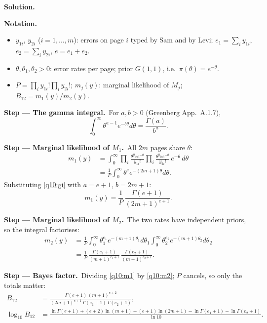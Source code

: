 \documentclass[11pt,a4paper]{article}
\numberwithin{equation}{questao}   %
\newenvironment{notacao}{\par\smallskip\noindent\textbf{Notation.}\begin{itemize}[leftmargin=1.4em,topsep=1pt,itemsep=0pt]\small}{\end{itemize}}
\newcommand{\passo}[2]{\par\smallskip\noindent\textbf{Step --- #1.}~#2}
\newcommand{\solhead}{\par\medskip\noindent{\color{blue!55!black}\rule{\linewidth}{0.3pt}}\par\noindent\textbf{Solution.}}
\newcommand{\1}{\mathbf{1}}
\begin{document}
\begin{sol}
\solhead
\begin{notacao}
\item $y_{1i}$, $y_{2i}$ ($i=1,\ldots,m$): errors on page $i$ typed by Sam and by Levi; $e_1=\sum_iy_{1i}$, $e_2=\sum_iy_{2i}$, $e=e_1+e_2$.
\item $\theta,\theta_1,\theta_2>0$: error rates per page; prior $G(1,1)$, i.e.\ $\pi(\theta)=e^{-\theta}$.
\item $P=\prod_iy_{1i}!\prod_iy_{2i}!$; $m_j(y)$: marginal likelihood of $M_j$; $B_{12}=m_1(y)/m_2(y)$.
\end{notacao}

\passo{The gamma integral}{For $a,b>0$ (Greenberg App.~A.1.7),}
\begin{equation}\label{q10:gi}
\int_0^\infty\theta^{a-1}e^{-b\theta}d\theta=\frac{\Gamma(a)}{b^{a}}.
\end{equation}

\passo{Marginal likelihood of $M_1$}{All $2m$ pages share $\theta$:}
\begin{align}
m_1(y)&=\int_0^\infty\prod_{i}\frac{\theta^{y_{1i}}e^{-\theta}}{y_{1i}!}\prod_{i}\frac{\theta^{y_{2i}}e^{-\theta}}{y_{2i}!}\,e^{-\theta}\,d\theta\label{q10:m1a}\\
&=\frac1P\int_0^\infty\theta^{e}e^{-(2m+1)\theta}d\theta.\label{q10:m1b}
\end{align}
Substituting \eqref{q10:gi} with $a=e+1$, $b=2m+1$:
\begin{equation}\label{q10:m1}
m_1(y)=\frac1P\,\frac{\Gamma(e+1)}{(2m+1)^{e+1}}.
\end{equation}

\passo{Marginal likelihood of $M_2$}{The two rates have independent priors, so the integral factorises:}
\begin{align}
m_2(y)&=\frac1P\int_0^\infty\theta_1^{e_1}e^{-(m+1)\theta_1}d\theta_1\int_0^\infty\theta_2^{e_2}e^{-(m+1)\theta_2}d\theta_2\label{q10:m2a}\\
&=\frac1P\,\frac{\Gamma(e_1+1)}{(m+1)^{e_1+1}}\,\frac{\Gamma(e_2+1)}{(m+1)^{e_2+1}}.\label{q10:m2}
\end{align}

\passo{Bayes factor}{Dividing \eqref{q10:m1} by \eqref{q10:m2}; $P$ cancels, so only the totals matter:}
\begin{align}
B_{12}&=\frac{\Gamma(e+1)\,(m+1)^{e+2}}{(2m+1)^{e+1}\,\Gamma(e_1+1)\,\Gamma(e_2+1)},\label{q10:B}\\
\log_{10}B_{12}&=\frac{\ln\Gamma(e+1)+(e+2)\ln(m+1)-(e+1)\ln(2m+1)-\ln\Gamma(e_1+1)-\ln\Gamma(e_2+1)}{\ln10}.\label{q10:logB}
\end{align}


\end{sol}
\end{document}
